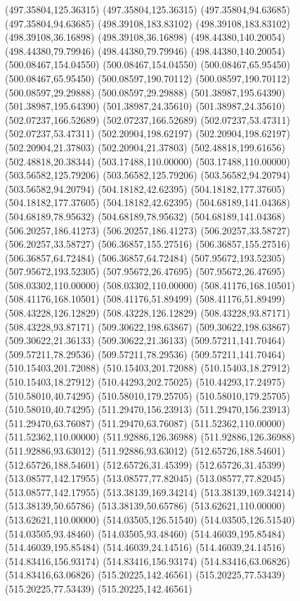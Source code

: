 {(497.35804,125.36315) (497.35804,125.36315) (497.35804,94.63685) (497.35804,94.63685) (498.39108,183.83102) (498.39108,183.83102) (498.39108,36.16898) (498.39108,36.16898)
(498.44380,140.20054) (498.44380,79.79946) (498.44380,79.79946) (498.44380,140.20054) (500.08467,154.04550) (500.08467,154.04550) (500.08467,65.95450) (500.08467,65.95450)
(500.08597,190.70112) (500.08597,190.70112) (500.08597,29.29888) (500.08597,29.29888) (501.38987,195.64390) (501.38987,195.64390) (501.38987,24.35610) (501.38987,24.35610)
(502.07237,166.52689) (502.07237,166.52689) (502.07237,53.47311) (502.07237,53.47311) (502.20904,198.62197) (502.20904,198.62197) (502.20904,21.37803) (502.20904,21.37803)
(502.48818,199.61656) (502.48818,20.38344) (503.17488,110.00000) (503.17488,110.00000) (503.56582,125.79206) (503.56582,125.79206) (503.56582,94.20794) (503.56582,94.20794)
(504.18182,42.62395) (504.18182,177.37605) (504.18182,177.37605) (504.18182,42.62395) (504.68189,141.04368) (504.68189,78.95632) (504.68189,78.95632) (504.68189,141.04368)
(506.20257,186.41273) (506.20257,186.41273) (506.20257,33.58727) (506.20257,33.58727) (506.36857,155.27516) (506.36857,155.27516) (506.36857,64.72484) (506.36857,64.72484)
(507.95672,193.52305) (507.95672,193.52305) (507.95672,26.47695) (507.95672,26.47695) (508.03302,110.00000) (508.03302,110.00000) (508.41176,168.10501) (508.41176,168.10501)
(508.41176,51.89499) (508.41176,51.89499) (508.43228,126.12829) (508.43228,126.12829) (508.43228,93.87171) (508.43228,93.87171) (509.30622,198.63867) (509.30622,198.63867)
(509.30622,21.36133) (509.30622,21.36133) (509.57211,141.70464) (509.57211,78.29536) (509.57211,78.29536) (509.57211,141.70464) (510.15403,201.72088) (510.15403,201.72088)
(510.15403,18.27912) (510.15403,18.27912) (510.44293,202.75025) (510.44293,17.24975) (510.58010,40.74295) (510.58010,179.25705) (510.58010,179.25705) (510.58010,40.74295)
(511.29470,156.23913) (511.29470,156.23913) (511.29470,63.76087) (511.29470,63.76087) (511.52362,110.00000) (511.52362,110.00000) (511.92886,126.36988) (511.92886,126.36988)
(511.92886,93.63012) (511.92886,93.63012) (512.65726,188.54601) (512.65726,188.54601) (512.65726,31.45399) (512.65726,31.45399) (513.08577,142.17955) (513.08577,77.82045)
(513.08577,77.82045) (513.08577,142.17955) (513.38139,169.34214) (513.38139,169.34214) (513.38139,50.65786) (513.38139,50.65786) (513.62621,110.00000) (513.62621,110.00000)
(514.03505,126.51540) (514.03505,126.51540) (514.03505,93.48460) (514.03505,93.48460) (514.46039,195.85484) (514.46039,195.85484) (514.46039,24.14516) (514.46039,24.14516)
(514.83416,156.93174) (514.83416,156.93174) (514.83416,63.06826) (514.83416,63.06826) (515.20225,142.46561) (515.20225,77.53439) (515.20225,77.53439) (515.20225,142.46561)
}
